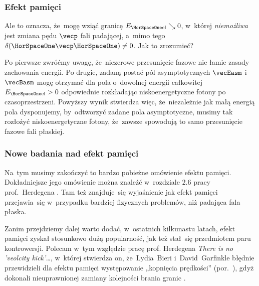 \documentclass[10pt,t]{beamer}
\begin{document}
\begin{frame}
  \frametitle{Efekt pamięci}


  Ale to oznacza, że~mogę wziąć granicę $E_{ \HorSpaceOne \text{el} } \searrow 0$,
  w~której \textit{niemożliwa} jest zmiana pędu $\vecp$ fali padającej,
  a~mimo tego $\delta( \HorSpaceOne \vecp \HorSpaceOne ) \neq 0$. Jak to zrozumieć?

  Po pierwsze zwróćmy uwagę, że~niezerowe przesunięcie fazowe nie łamie
  zasady zachowania energii. Po drugie, zadaną postać pól asymptotycznych
  $\vecEasm$ i~$\vecBasm$ mogę otrzymać dla pola o~dowolnej energii
  całkowitej $E_{ \HorSpaceOne \text{el} } > 0$ odpowiednie rozkładając
  niskoenergetyczne fotony po czasoprzestrzeni. Powyższy wynik stwierdza
  więc, że~niezależnie jak małą energią pola dysponujemy, by~odtworzyć
  zadane pola asymptotyczne, musimy tak rozłożyć niskoenergetyczne fotony,
  że~zawsze spowodują to samo przesunięcie fazowe fali płaskiej.


\end{frame}





\begin{frame}
  \frametitle{Nowe badania nad efekt pamięci}


  Na~tym musimy zakończyć to bardzo pobieżne omówienie efektu pamięci.
  Dokładniejsze jego omówienie można znaleźć w~rozdziale $2.6$ pracy
  prof.~Herdegena
  \parencite{Herdegen-Infrared-structure-beyond-locality-ETC-Ver-2024}. Tam
  też znajduje~się wyjaśnienie jak efekt pamięci przejawia~się w~przypadku
  bardziej fizycznych problemów, niż padająca fala płaska.

  Zanim przejdziemy dalej warto dodać, w~ostatnich
  kilkunastu latach, efekt pamięci zyskał stosunkowo dużą popularność, jak
  też stał~się przedmiotem paru kontrowersji. Polecam w~tym względzie pracę
  prof. Herdegena
  {\textit{There is no 'veolcity kick'\ldots}}, w~której stwierdza on,
  że~Lydia~Bieri i~David~Garfinkle błędnie przewidzieli dla efektu pamięci
  występowanie „kopnięcia prędkości”
  (por.~\parencite{Bieri-Garfinkle-An-electromagnetic-analogue-of-ETC-Pub-2013}),
  gdyż dokonali nieuprawnionej zamiany kolejności brania granic
  \parencite{Herdegen-There-Is-No-Velocity-Kick-Memory-ETC-Pub-2024}.

\end{frame}
\end{document}
